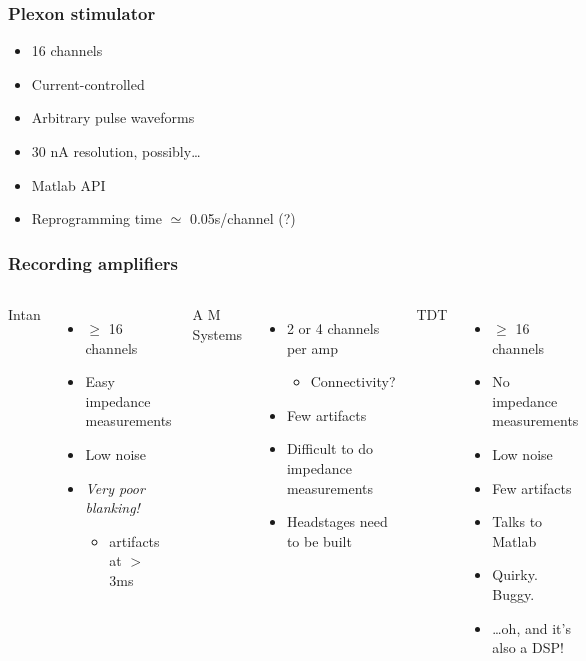 \documentclass{beamer}
\begin{document}
\begin{frame}
  \frametitle{Plexon stimulator}
  \begin{itemize}
    \item 16 channels
    \item Current-controlled
    \item Arbitrary pulse waveforms
    \item 30 nA resolution, possibly\dots
    \item Matlab API
    \item Reprogramming time $\simeq$ 0.05s/channel (?)
  \end{itemize}
\end{frame}
    

\begin{frame}
  \frametitle{Recording amplifiers}
  \begin{columns}
    \column{33mm}
    Intan
    \begin{itemize}
      \item $\geq$ 16 channels
      \item Easy impedance measurements
      \item Low noise
      \item {\em Very poor blanking!}
        \begin{itemize}
        \item artifacts at $>$ 3ms
        \end{itemize}
    \end{itemize}
    \column{36mm}
    A M Systems
    \begin{itemize}
      \item 2 or 4 channels per amp
        \begin{itemize}
          \item Connectivity?
        \end{itemize}
      \item Few artifacts
      \item Difficult to do impedance measurements
      \item Headstages need to be built
    \end{itemize}
    \column{33mm}
    TDT
    \begin{itemize}
      \item $\geq$ 16 channels
      \item No impedance measurements
      \item Low noise
      \item Few artifacts
      \item Talks to Matlab
      \item Quirky.  Buggy.
      \item \dots oh, and it's also a DSP!
    \end{itemize}
  \end{columns}
\end{frame}
\end{document}
